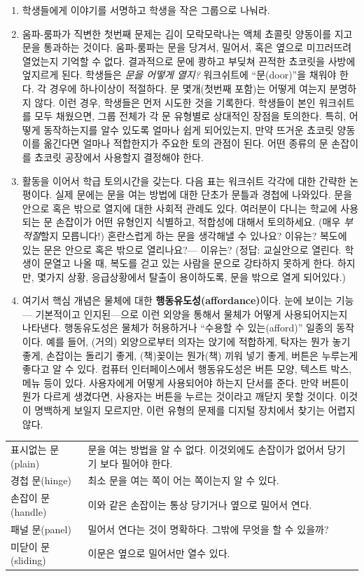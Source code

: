 \documentclass[]{article}
\begin{document}
\begin{enumerate}
\item
  학생들에게 이야기를 서명하고 학생을 작은 그룹으로 나눠라.
\item
  움파-룸파가 직변한 첫번째 문제는 김이 모락모락나는 액체 쵸콜릿
  양동이를 지고 문을 통과하는 것이다. 움파-룸파는 문을 당겨서, 밀어서,
  혹은 옆으로 미끄러뜨려 열었는지 기억할 수 없다. 결과적으로 문에 쾅하고
  부딪쳐 끈적한 쵸코릿을 사방에 엎지르게 된다. 학생들은 \emph{문을
  어떻게 열지?} 워크쉬트에 ``문(door)''을 채워야 한다. 각 경우에
  하나이상이 적절하다. 문 몇개(첫번째 포함)는 어떻게 여는지 분명하지
  않다. 이런 경우, 학생들은 먼저 시도한 것을 기록한다. 학생들이 본인
  워크쉬트를 모두 채웠으면, 그룹 전체가 각 문 유형별로 상대적인 장점을
  토의한다. 특히, 어떻게 동작하는지를 알수 있도록 얼마나 쉽게
  되어있는지, 만약 뜨거운 쵸코릿 양동이를 옮긴다면 얼마나 적합한지가
  주요한 토의 관점이 된다. 어떤 종류의 문 손잡이를 쵸코릿 공장에서
  사용할지 결정해야 한다.
\item
  활동을 이어서 학급 토의시간을 갖는다. 다음 표는 워크쉬트 각각에 대한
  간략한 논평이다. 실제 문에는 문을 여는 방법에 대한 단초가 문틀과
  경첩에 나와있다. 문을 안으로 혹은 밖으로 열지에 대한 사회적 관례도
  있다. 여러분이 다니는 학교에 사용되는 문 손잡이가 어떤 유형인지
  식별하고, 적합성에 대해서 토의하세요. (매우 \emph{부적절}할지
  모릅니다!) 혼란스럽게 하는 문을 생각해낼 수 있나요? 이유는? 복도에
  있는 문은 안으로 혹은 밖으로 열리나요?--- 이유는? (정답: 교실안으로
  열린다. 학생이 문열고 나올 때, 복도를 걷고 있는 사람을 문으로 강타하지
  못하게 한다. 하지만, 몇가지 상황, 응급상황에서 탈출이 용이하도록, 문을
  밖으로 열게 되어있다.)
\item
  여기서 핵심 개념은 물체에 대한 \textbf{행동유도성(affordance)}이다.
  눈에 보이는 기능--- 기본적이고 인지된---으로 이런 외양을 통해서 물체가
  어떻게 사용되어지는지 나타낸다. 행동유도성은 물체가 허용하거나
  ``수용할 수 있는(afford)'' 일종의 동작이다. 예를 들어, (거의)
  외양으로부터 의자는 앉기에 적합하게, 탁자는 뭔가 놓기 좋게, 손잡이는
  돌리기 좋게, (책)꽂이는 뭔가(책) 끼워 넣기 좋게, 버튼은 누루는게
  좋다고 알 수 있다. 컴퓨터 인터페이스에서 행동유도성은 버튼 모양,
  텍스트 박스, 메뉴 등이 있다. 사용자에게 어떻게 사용되어야 하는지
  단서를 준다. 만약 버튼이 뭔가 다르게 생겼다면, 사용자는 버튼을 누르는
  것이라고 깨닫지 못할 것이다. 이것이 명백하게 보일지 모르지만, 이런
  유형의 문제를 디지털 장치에서 찾기는 어렵지 않다.
\end{enumerate}

\begin{longtable}[c]{@{}ll@{}}
\toprule
표시없는 문(plain) & 문을 여는 방법을 알 수 없다. 이것외에도 손잡이가
없어서 당기기 보다 필어야 한다.\tabularnewline
경첩 문(hinge) & 최소 문을 여는 쪽이 어는 쪽이는지 알 수
있다.\tabularnewline
손잡이 문(handle) & 이와 같은 손잡이는 통상 당기거나 옆으로 밀어서
연다.\tabularnewline
패널 문(panel) & 밀어서 연다는 것이 명확하다. 그밖에 무엇을 할 수
있을까?\tabularnewline
미닫이 문(sliding) & 이문은 옆으로 밀어서만 열수 있다.\tabularnewline
\bottomrule
\end{longtable}
\end{document}
